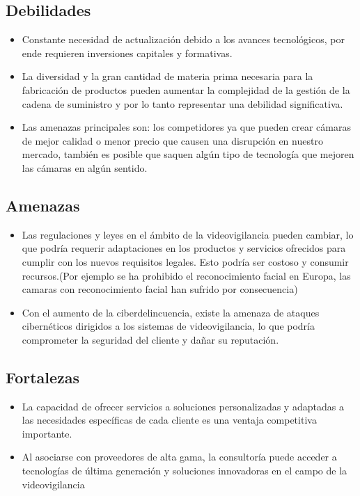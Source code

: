 \documentclass{report}
\begin{document}
        \subsection*{Debilidades}
            \begin{itemize}
                \item Constante necesidad de actualización debido a los avances tecnológicos, por ende requieren inversiones capitales y formativas.
                \item La diversidad y la gran cantidad de materia prima necesaria para la fabricación de productos pueden aumentar la complejidad de la gestión de la cadena de suministro y por lo tanto representar una debilidad significativa.
                \item Las amenazas principales son: los competidores ya que pueden crear cámaras de mejor calidad o menor precio que causen una disrupción en nuestro mercado, también es posible que saquen algún tipo de tecnología que mejoren las cámaras en algún sentido.
            \end{itemize} 
        \subsection*{Amenazas}
            \begin{itemize}
                \item Las regulaciones y leyes en el ámbito de la videovigilancia pueden cambiar, lo que podría requerir adaptaciones en los productos y servicios ofrecidos para cumplir con los nuevos requisitos legales. Esto podría ser costoso y consumir recursos.(Por ejemplo se ha prohibido el reconocimiento facial en Europa, las camaras con reconocimiento facial han sufrido por consecuencia)
                \item Con el aumento de la ciberdelincuencia, existe la amenaza de ataques cibernéticos dirigidos a los sistemas de videovigilancia, lo que podría comprometer la seguridad del cliente y dañar su reputación.
            \end{itemize}
        \subsection*{Fortalezas}
            \begin{itemize}
                \item La capacidad de ofrecer servicios a soluciones personalizadas y adaptadas a las necesidades específicas de cada cliente es una ventaja competitiva importante.
                \item Al asociarse con proveedores de alta gama, la consultoría puede acceder a tecnologías de última generación y soluciones innovadoras en el campo de la videovigilancia
            \end{itemize}
\end{document}
